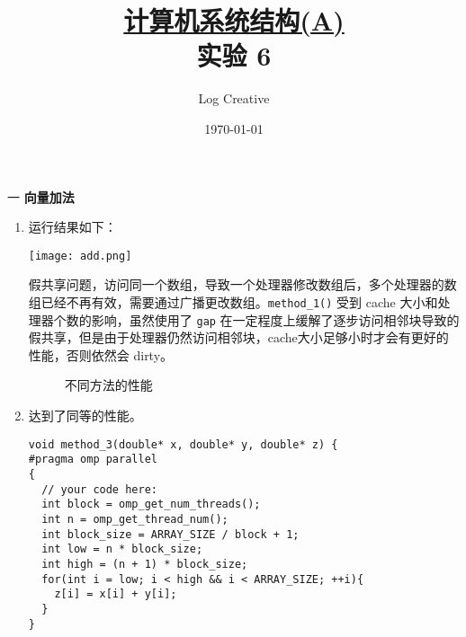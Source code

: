 \documentclass[12pt,a4paper]{article}
\newenvironment{problems}{\begin{list}{}{\renewcommand{\makelabel}[1]{\textbf{##1}.\hfil}}}{\end{list}}
\begin{document}
\title{\normalsize \underline{计算机系统结构(A)}\\\LARGE 实验 6}
\author{Log Creative }
\date{\today}
\maketitle

\begin{problems}
    \item[一] \textbf{向量加法}
    
	\begin{enumerate}
		\item 运行结果如下：
		
		\texttt{[image: add.png]}

		假共享问题，访问同一个数组，导致一个处理器修改数组后，多个处理器的数组已经不再有效，需要通过广播更改数组。\verb"method_1()" 受到 cache 大小和处理器个数的影响，虽然使用了 \texttt{gap} 在一定程度上缓解了逐步访问相邻块导致的假共享，但是由于处理器仍然访问相邻块，cache大小足够小时才会有更好的性能，否则依然会 dirty。

		\begin{figure}[h]
		\caption{不同方法的性能}
		\end{figure}			

		\item 达到了同等的性能。
		\begin{lstlisting}
void method_3(double* x, double* y, double* z) {
#pragma omp parallel
{
  // your code here:
  int block = omp_get_num_threads();
  int n = omp_get_thread_num();
  int block_size = ARRAY_SIZE / block + 1;
  int low = n * block_size;
  int high = (n + 1) * block_size;
  for(int i = low; i < high && i < ARRAY_SIZE; ++i){
    z[i] = x[i] + y[i];
  }
}


\end{lstlisting}
\end{enumerate}
\end{problems}
\end{document}
